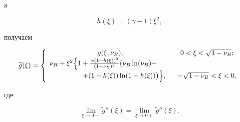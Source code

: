 а 

$$h(\xi)=(\gamma-1)\xi^2,$$

получаем

\begin{gather}

\widetilde{g}(\xi)=\left\{\begin{array}{cc}

g(\xi, \nu_B),& 0<\xi< \sqrt{1-\nu_B};\\

\nu_B+\xi^2\Bigl\{

1+\frac{\alpha(1-h(\xi))^2}{(1-\nu_B)^2}

\bigl(

\nu_B\ln(\nu_B)+ \qquad\\

\qquad \qquad

+(1-h(\xi))\ln(1-h(\xi))\bigr)\Bigr\}

,& -\sqrt{1-\nu_B}<\xi<0,

\end{array}\right.\label{lukashev:gPeregrev}

\end{gather}

где 

$$\lim\limits_{\xi\to 0-} \widetilde{g}''(\xi)=\lim_{\xi\to 0+} \widetilde{g}''(\xi).$$








